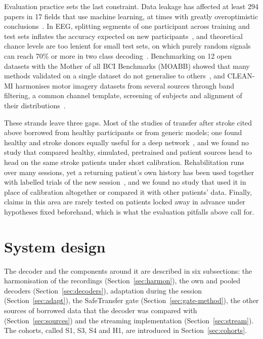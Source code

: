 \documentclass[pdflatex,sn-mathphys-num]{sn-jnl}
\begin{document}
Evaluation practice sets the last constraint. Data leakage has affected at least 294 papers in 17 fields that use machine learning, at times with greatly overoptimistic conclusions~\cite{kapoor2023}. In EEG, splitting segments of one participant across training and test sets inflates the accuracy expected on new participants~\cite{brookshire2024}, and theoretical chance levels are too lenient for small test sets, on which purely random signals can reach 70\% or more in two class decoding~\cite{combrisson2015}. Benchmarking on 12 open datasets with the Mother of all BCI Benchmarks (MOABB) showed that many methods validated on a single dataset do not generalise to others~\cite{jayaram2018}, and CLEAN-MI harmonises motor imagery datasets from several sources through band filtering, a common channel template, screening of subjects and alignment of their distributions~\cite{liu2025cleanmi}.

These strands leave three gaps. Most of the studies of transfer after stroke cited above borrowed from healthy participants or from generic models; one found healthy and stroke donors equally useful for a deep network~\cite{nagarajan2024}, and we found no study that compared healthy, simulated, pretrained and patient sources head to head on the same stroke patients under short calibration. Rehabilitation runs over many sessions, yet a returning patient's own history has been used together with labelled trials of the new session~\cite{giles2022}, and we found no study that used it in place of calibration altogether or compared it with other patients' data. Finally, claims in this area are rarely tested on patients locked away in advance under hypotheses fixed beforehand, which is what the evaluation pitfalls above call for.

\section{System design}\label{sec:design}

The decoder and the components around it are described in six subsections: the harmonisation of the recordings (Section~\ref{sec:harmon}), the own and pooled decoders (Section~\ref{sec:decoders}), adaptation during the session (Section~\ref{sec:adapt}), the SafeTransfer gate (Section~\ref{sec:gate-method}), the other sources of borrowed data that the decoder was compared with (Section~\ref{sec:sources}) and the streaming implementation (Section~\ref{sec:stream}). The cohorts, called S1, S3, S4 and H1, are introduced in Section~\ref{sec:cohorts}.
\end{document}

